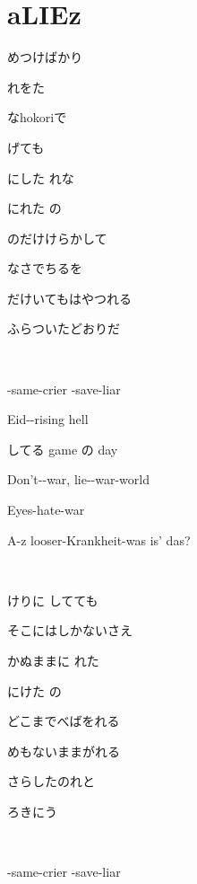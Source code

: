 \section{aLIEz}

めつけばかり

れをた

なhokoriで

げても

にした れな

にれた の

のだけけらかして

なさでちるを

だけいてもはやつれる

ふらついたどおりだ

~

-same-crier -save-liar

Eid--rising hell

してる game の day

Don't--war, lie--war-world

Eyes-hate-war

A-z looser-Krankheit-was is' das?

~

けりに してても

そこにはしかないさえ

かぬままに れた

にけた の

どこまでべばをれる

めもないままがれる

さらしたのれと

ろきにう

~

-same-crier -save-liar

